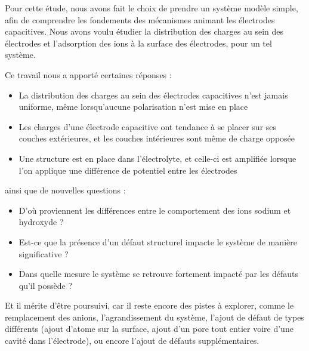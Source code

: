 
Pour cette étude, nous avons fait le choix de prendre un système modèle simple, afin de comprendre les fondements des mécanismes animant les électrodes capacitives. Nous avons voulu étudier la distribution des charges au sein des électrodes et l'adsorption des ions à la surface des électrodes, pour un tel système.

Ce travail nous a apporté certaines réponses :
\begin{itemize}
    \item La distribution des charges au sein des électrodes capacitives n'est jamais uniforme, même lorsqu'aucune polarisation n'est mise en place
    \item Les charges d'une électrode capacitive ont tendance à se placer sur ses couches extérieures, et les couches intérieures sont même de charge opposée
    \item Une structure est en place dans l'électrolyte, et celle-ci est amplifiée lorsque l'on applique une différence de potentiel entre les électrodes
\end{itemize}
ainsi que de nouvelles questions :
\begin{itemize}
    \item D'où proviennent les différences entre le comportement des ions sodium et hydroxyde ?
    \item Est-ce que la présence d'un défaut structurel impacte le système de manière significative ?
    \item Dans quelle mesure le système se retrouve fortement impacté par les défauts qu'il possède ?
\end{itemize}

Et il mérite d'être poursuivi, car il reste encore des pistes à explorer, comme le remplacement des anions, l'agrandissement du système, l'ajout de défaut de types différents (ajout d'atome sur la surface, ajout d'un pore tout entier voire d'une cavité dans l'électrode), ou encore l'ajout de défauts supplémentaires.
